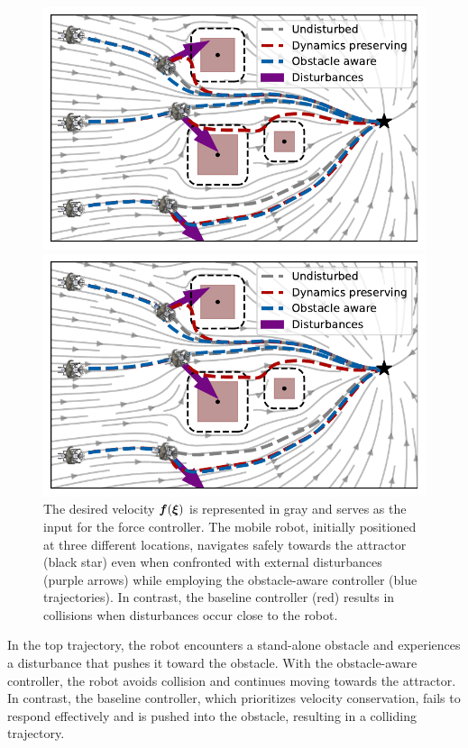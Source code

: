\begin{figure}[htbp]
  \centering
  \ifthesis
  \centerline{\includegraphics[width=0.8\columnwidth]{figures/multi_obstacle_with_damping.pdf}}
  \else
  \centerline{\includegraphics[width=0.95\columnwidth]{figures/multi_obstacle_with_damping.pdf}}
  \fi
  \caption{
  The desired velocity $\boldsymbol{f}(\boldsymbol{\xi})$ is represented in gray and serves as the input for the force controller. The mobile robot, initially positioned at three different locations, navigates safely towards the attractor (black star) even when confronted with external disturbances (purple arrows) while employing the obstacle-aware controller (blue trajectories). In contrast, the baseline controller (red) results in collisions when disturbances occur close to the robot.
  }
  \label{fig:obstacle_aware_damping_comparison}
\end{figure}

In the top trajectory, the robot encounters a stand-alone obstacle and experiences a disturbance that pushes it toward the obstacle. With the obstacle-aware controller, the robot avoids collision and continues moving towards the attractor. In contrast, the baseline controller, which prioritizes velocity conservation, fails to respond effectively and is pushed into the obstacle, resulting in a colliding trajectory.

